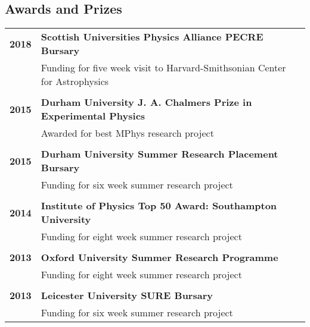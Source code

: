 \documentclass[a4paper,fleqn,usenatbib,onecolumn]{mnras}
\begin{document}
\subsection*{Awards and Prizes}
\begingroup
\setlength{\tabcolsep}{0pt} %
\renewcommand{\arraystretch}{1.1} %
\begin{longtable}{ p{2cm} p{15cm} }

\bf{2018} & \bf{Scottish Universities Physics Alliance PECRE Bursary}\\
&  Funding for five week visit to Harvard-Smithsonian Center for Astrophysics\\
\\
\bf{2015} & \bf{Durham University J. A. Chalmers Prize in Experimental Physics}\\
& Awarded for best MPhys research project\\
\\
\bf{2015} & \bf{Durham University Summer Research Placement Bursary}\\
& Funding for six week summer research project \\
\\
\bf{2014} & \bf{Institute of Physics Top 50 Award: Southampton University}\\
& Funding for eight week summer research project\\
\\
\bf{2013} & \bf{Oxford University Summer Research Programme}\\
& Funding for eight week summer research project\\
\\
\bf{2013} & \bf{Leicester University SURE Bursary}\\
& Funding for six week summer research project\\

\end{longtable}
\endgroup
\end{document}
